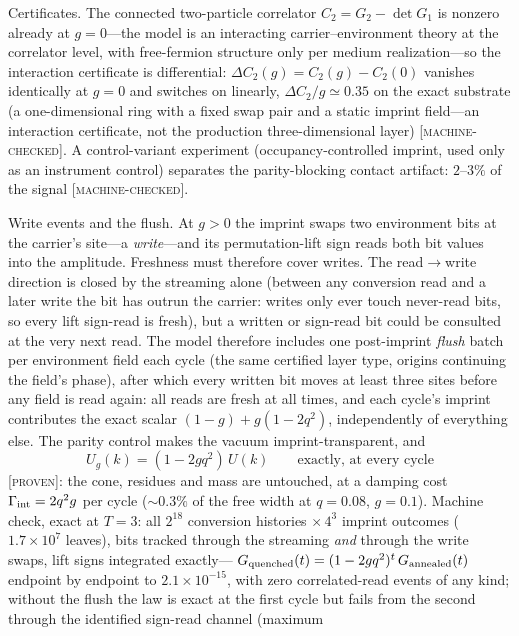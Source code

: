 \documentclass[aps,prd,twocolumn,superscriptaddress,nofootinbib,floatfix]{revtex4-2}
\newcommand{\evP}{\textnormal{\textsc{[proven]}}}
\newcommand{\evM}{\textnormal{\textsc{[machine-checked]}}}
\begin{document}
Certificates. The connected two-particle correlator
$C_2=G_2-\det G_1$ is nonzero already at $g=0$---the model is an
interacting carrier--environment theory at the correlator level, with
free-fermion structure only per medium realization---so the interaction
certificate is differential: $\Delta C_2(g)=C_2(g)-C_2(0)$ vanishes
identically at $g=0$ and switches on linearly,
$\Delta C_2/g\simeq0.35$ on the exact substrate (a one-dimensional ring
with a fixed swap pair and a static imprint field---an interaction
certificate, not the production three-dimensional layer) \evM{}. A control-variant
experiment (occupancy-controlled imprint, used only as an instrument
control) separates the parity-blocking contact artifact: $2$--$3\%$ of the
signal \evM{}.

Write events and the flush. At $g>0$ the imprint swaps two environment
bits at the carrier's site---a \emph{write}---and its permutation-lift
sign reads both bit values into the amplitude. Freshness must therefore
cover writes. The read$\to$write direction is closed by the streaming
alone (between any conversion read and a later write the bit has
outrun the carrier: writes only ever touch never-read bits, so every
lift sign-read is fresh), but a written or sign-read bit could be
consulted at the very next read. The model therefore includes one
post-imprint \emph{flush} batch per environment field each cycle (the
same certified layer type, origins continuing the field's phase), after
which every written bit moves at least three sites before any field is
read again: all reads are fresh at all times, and each cycle's imprint
contributes the exact scalar $(1-g)+g(1-2q^2)$, independently of
everything else. The parity control makes the vacuum
imprint-transparent, and
\begin{equation}
U_g(k)=(1-2gq^2)\,U(k)\qquad\text{exactly, at every cycle}
\label{eq:intlaw}
\end{equation}
\evP{}: the cone, residues and mass are untouched, at a damping cost
$\Gamma_{\rm int}=2q^2g$ per cycle ($\sim0.3\%$ of the free width at
$q=0.08$, $g=0.1$). Machine check, exact at $T=3$: all $2^{18}$
conversion histories $\times\,4^3$ imprint outcomes ($1.7\times10^7$
leaves), bits tracked through the streaming \emph{and} through the
write swaps, lift signs integrated exactly---
$G_{\rm quenched}(t)=(1-2gq^2)^t\,G_{\rm annealed}(t)$ endpoint by
endpoint to $2.1\times10^{-15}$, with zero correlated-read events of any
kind; without the flush the law is exact at the first cycle but fails
from the second through the identified sign-read channel (maximum
\end{document}
